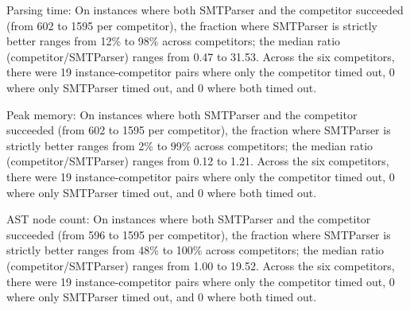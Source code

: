 
Parsing time: On instances where both SMTParser and the competitor succeeded (from 602 to 1595 per competitor), the fraction where SMTParser is strictly better ranges from 12\% to 98\% across competitors; the median ratio (competitor/SMTParser) ranges from 0.47 to 31.53. Across the six competitors, there were 19 instance-competitor pairs where only the competitor timed out, 0 where only SMTParser timed out, and 0 where both timed out.

Peak memory: On instances where both SMTParser and the competitor succeeded (from 602 to 1595 per competitor), the fraction where SMTParser is strictly better ranges from 2\% to 99\% across competitors; the median ratio (competitor/SMTParser) ranges from 0.12 to 1.21. Across the six competitors, there were 19 instance-competitor pairs where only the competitor timed out, 0 where only SMTParser timed out, and 0 where both timed out.

AST node count: On instances where both SMTParser and the competitor succeeded (from 596 to 1595 per competitor), the fraction where SMTParser is strictly better ranges from 48\% to 100\% across competitors; the median ratio (competitor/SMTParser) ranges from 1.00 to 19.52. Across the six competitors, there were 19 instance-competitor pairs where only the competitor timed out, 0 where only SMTParser timed out, and 0 where both timed out.
